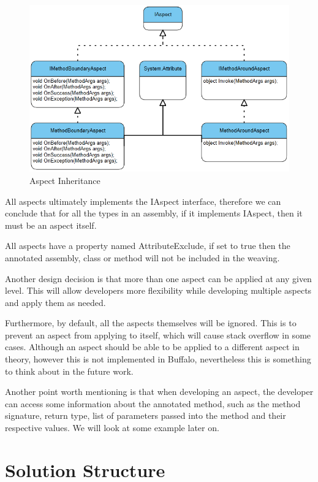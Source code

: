 \begin{figure}[H]
  \includegraphics[scale=1.0]{Uml01.PNG}
  \centering
  \caption{Aspect Inheritance\label{uml01}}
\end{figure}

All aspects ultimately implements the IAspect interface, therefore we can conclude that for all the types in an assembly, if it implements IAspect, then it must be an aspect itself.

All aspects have a property named AttributeExclude, if set to true then the annotated assembly, class or method will not be included in the weaving.

Another design decision is that more than one aspect can be applied at any given level. This will allow developers more flexibility while developing multiple aspects and apply them as needed.

Furthermore, by default, all the aspects themselves will be ignored. This is to prevent an aspect from applying to itself, which will cause stack overflow in some cases. Although an aspect should be able to be applied to a different aspect in theory, however this is not implemented in Buffalo, nevertheless this is something to think about in the future work.

Another point worth mentioning is that when developing an aspect, the developer can access some information about the annotated method, such as the method signature, return type, list of parameters passed into the method and their respective values. We will look at some example later on.

\section{Solution Structure}


